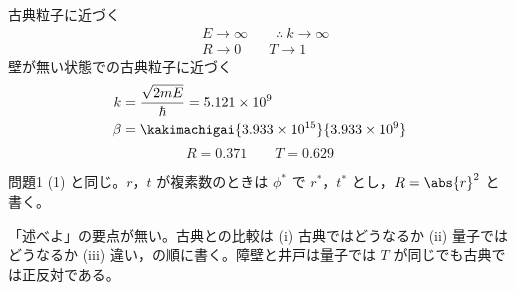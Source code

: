 古典粒子に近づく
\begin{align*}
&E\to\infty\qquad\therefore\ k\to\infty\\
&R\to0\qquad T\to1
\end{align*}
壁が無い状態での古典粒子に近づく
\begin{align*}
k&=\frac{\sqrt{2mE}}{\hbar}=5.121\times10^{9}\\
\beta&=\kakimachigai{3.933\times10^{15}}{3.933\times10^{9}}
\end{align*}
\[ R=0.371\qquad T=0.629 \]
\item 問題1 (1) と同じ。$r$，$t$ が複素数のときは $\phi^{*}$ で $r^{*}$，$t^{*}$ とし，$R=\abs{r}^{2}$ と書く。
\item {} 「述べよ」の要点が無い。古典との比較は (i) 古典ではどうなるか (ii) 量子ではどうなるか (iii) 違い，の順に書く。障壁と井戸は量子では $T$ が同じでも古典では正反対である。
